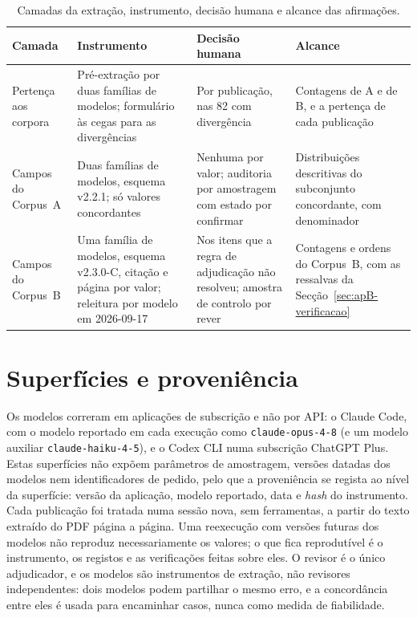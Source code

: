 \begin{table}[htbp]
  \centering\footnotesize
  \caption[Camadas da extração e o que cada uma permite afirmar]{Camadas da
  extração, instrumento, decisão humana e alcance das afirmações.}
  \label{tab:apB-camadas}
  \begin{tabularx}{\textwidth}{@{}>{\raggedright\arraybackslash}p{2.2cm}>{\raggedright\arraybackslash}X>{\raggedright\arraybackslash}p{3.0cm}>{\raggedright\arraybackslash}X@{}}
    \toprule
    Camada & Instrumento & Decisão humana & Alcance \\
    \midrule
    Pertença aos corpora & Pré-extração por duas famílias de modelos; formulário às cegas para as divergências & Por publicação, nas 82 com divergência & Contagens de A e de B, e a pertença de cada publicação \\
    \addlinespace
    Campos do Corpus~A & Duas famílias de modelos, esquema v2.2.1; só valores concordantes & Nenhuma por valor; auditoria por amostragem com estado por confirmar & Distribuições descritivas do subconjunto concordante, com denominador \\
    \addlinespace
    Campos do Corpus~B & Uma família de modelos, esquema v2.3.0-C, citação e página por valor; releitura por modelo em 2026-09-17 & Nos itens que a regra de adjudicação não resolveu; amostra de controlo por rever & Contagens e ordens do Corpus~B, com as ressalvas da Secção~\ref{sec:apB-verificacao} \\
    \bottomrule
  \end{tabularx}
\end{table}

\section{Superfícies e proveniência}
\label{sec:apB-superficies}

Os modelos correram em aplicações de subscrição e não por API: o Claude Code,
com o modelo reportado em cada execução como \texttt{claude-opus-4-8} (e um
modelo auxiliar \texttt{claude-haiku-4-5}), e o Codex CLI numa subscrição
ChatGPT Plus. Estas superfícies não expõem parâmetros de amostragem, versões
datadas dos modelos nem identificadores de pedido, pelo que a proveniência se
regista ao nível da superfície: versão da aplicação, modelo reportado, data e
\emph{hash} do instrumento. Cada publicação foi tratada numa sessão nova, sem
ferramentas, a partir do texto extraído do PDF página a página. Uma
reexecução com versões futuras dos modelos não reproduz necessariamente os
valores; o que fica reprodutível é o instrumento, os registos e as
verificações feitas sobre eles. O revisor é o único adjudicador, e os
modelos são instrumentos de extração, não revisores independentes: dois
modelos podem partilhar o mesmo erro, e a concordância entre eles é usada
para encaminhar casos, nunca como medida de fiabilidade.

